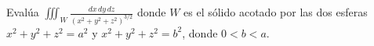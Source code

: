 Evalúa $\displaystyle \iiint_W \frac{dx\, dy\, dz}{(x^2 + y^2 + z^2)^{3/2}}$ donde $W$ es el sólido acotado por las dos esferas $x^2 + y^2 + z^2 = a^2$ y $x^2 + y^2 + z^2 = b^2$, donde $0 < b < a$.